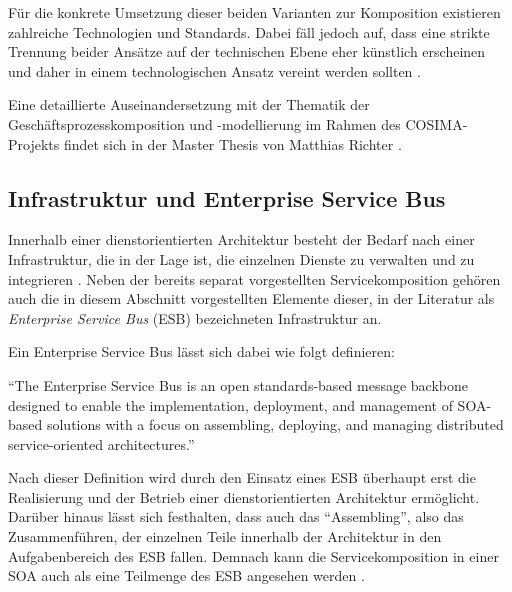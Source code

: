   Für die konkrete Umsetzung dieser beiden Varianten zur Komposition existieren zahlreiche Technologien und Standards. Dabei fäll jedoch auf, dass eine strikte Trennung beider Ansätze auf der technischen Ebene eher künstlich erscheinen und daher in einem technologischen Ansatz vereint werden sollten \citep[S. 42]{papazoglou2007soc}.
  
  Eine detaillierte Auseinandersetzung mit der Thematik der Geschäftsprozesskomposition und -modellierung im Rahmen des COSIMA-Projekts findet sich in der Master Thesis von Matthias Richter \citep{samma08}.



\subsection{Infrastruktur und Enterprise Service Bus} %
\label{sub:infrastruktur}

  Innerhalb einer dienstorientierten Architektur besteht der Bedarf nach einer Infrastruktur, die in der Lage ist, die einzelnen Dienste zu verwalten und zu integrieren \citep[S. 270]{web_services_principles_and_technology}. Neben der bereits separat vorgestellten Servicekomposition gehören auch die in diesem Abschnitt vorgestellten Elemente dieser, in der Literatur als \emph{Enterprise Service Bus} (ESB) bezeichneten Infrastruktur an.
  
  Ein Enterprise Service Bus lässt sich dabei wie folgt definieren:
  
  \begin{definition}[ESB]\label{def:enterprise_serivce_bus}
    "`The Enterprise Service Bus is an open standards-based message backbone designed to enable the implementation, deployment, and management of SOA-based solutions with a focus on assembling, deploying, and managing distributed service-oriented architectures."' \emph{\citep[S. 270]{web_services_principles_and_technology}}
  \end{definition}
  
  Nach dieser Definition wird durch den Einsatz eines ESB überhaupt erst die Realisierung und der Betrieb einer dienstorientierten Architektur ermöglicht. Darüber hinaus lässt sich festhalten, dass auch das "`Assembling"', also das Zusammenführen, der einzelnen Teile innerhalb der Architektur in den Aufgabenbereich des ESB fallen. Demnach kann die Servicekomposition in einer SOA auch als eine Teilmenge des ESB angesehen werden \citep[S. 3]{enterprise_service_bus}.

